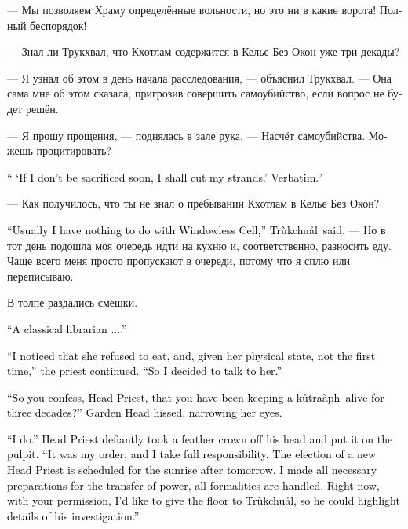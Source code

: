 \documentclass[a4paper,12pt,fleqn]{book}\usepackage{cooltooltips}\usepackage{polyglossia}\setdefaultlanguage{russian}\setotherlanguage{english}\defaultfontfeatures{Ligatures=TeX,Mapping=tex-text} \usepackage{xcolor}\definecolor{lightgray}{HTML}{bbbbbb}\color{lightgray}\newcommand{\ml}[3]{\textenglish{\textcolor{black}{#3}}}
\newcommand{\kutraph}{k\r{u}tr\={a}\`{a}ph}
\newcommand{\Trukchual}{Tr\`{u}kchu\r{a}l}
\begin{document}
--- Мы позволяем Храму определённые вольности, но это ни в какие ворота!
Полный беспорядок!

--- Знал ли Трукхвал, что Кхотлам содержится в Келье Без Окон уже три декады?

--- Я узнал об этом в день начала расследования, --- объяснил Трукхвал.
--- Она сама мне об этом сказала, пригрозив совершить самоубийство, если вопрос не будет решён.

--- Я прошу прощения, --- поднялась в зале рука.
--- Насчёт самоубийства.
Можешь процитировать?

\ml{$0$}
{--- <<Если меня не принесут в жертву в ближайшее время, я перережу себе жилы>>.}
{`` `If I don't be sacrificed soon, I shall cut my strands.'}
\ml{$0$}
{Это дословно.}
{Verbatim.''}

--- Как получилось, что ты не знал о пребывании Кхотлам в Келье Без Окон?

\ml{$0$}
{--- Обычно я не имею никакого отношения к Келье Без Окон, --- сказал Трукхвал.}
{``Usually I have nothing to do with Windowless Cell,'' \Trukchual\ said.}
--- Но в тот день подошла моя очередь идти на кухню и, соответственно, разносить еду.
Чаще всего меня просто пропускают в очереди, потому что я сплю или переписываю.

В толпе раздались смешки.

\ml{$0$}
{--- Типичный библиотекарь...}
{``A classical librarian ....''}

\ml{$0$}
{--- Я обратил внимание, что она отказалась от еды, и судя по её состоянию, уже не впервые, --- продолжил жрец.}
{``I noticed that she refused to eat, and, given her physical state, not the first time,'' the priest continued.}
\ml{$0$}
{--- Поэтому решил поговорить.}
{``So I decided to talk to her.''}

\ml{$0$}
{--- Так, значит, Первый жрец, ты признаёшь, что держал кутрапа живым три декады? --- сузив глаза, прошипела старшина Сада.}
{``So you confess, Head Priest, that you have been keeping a \kutraph\ alive for three decades?'' Garden Head hissed, narrowing her eyes.}

\ml{$0$}
{--- Признаю, --- Первый демонстративно снял перьевую корону и положил на кафедру.}
{``I do.'' Head Priest defiantly took a feather crown off his head and put it on the pulpit.}
\ml{$0$}
{--- Это был мой приказ, и ответственность лежит на мне.}
{``It was my order, and I take full responsibility.}
\ml{$0$}
{Выборы нового Первого жреца уже назначены на послезавтра, все необходимые для передачи полномочий приготовления мной сделаны и формальности соблюдены.}
{The election of a new Head Priest is scheduled for the sunrise after tomorrow, I made all necessary preparations for the transfer of power, all formalities are handled.}
\ml{$0$}
{Сейчас же, с вашего позволения, я хочу дать слово Трукхвалу, чтобы он осветил подробности своего расследования.}
{Right now, with your permission, I'd like to give the floor to \Trukchual, so he could highlight details of his investigation.''}
\end{document}

